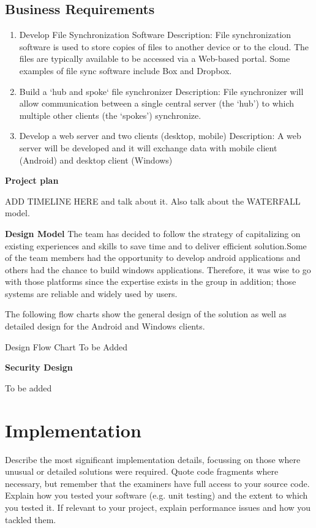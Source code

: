 \documentclass{article}
\begin{document}
\subsection{Business Requirements}
\begin{enumerate}
  \item Develop File Synchronization Software
  Description:  File synchronization software is used to store copies of files to another device or to the cloud. The files are typically available to be accessed via a Web-based portal. Some examples of file sync software include Box and Dropbox.
  \item Build a ‘hub and spoke‘ file synchronizer
  Description: File synchronizer will allow communication between a single central server (the ‘hub’) to which multiple other clients (the ‘spokes’) synchronize.
  \item Develop a web server and two clients (desktop, mobile)
  Description: A web server will be developed and it will exchange data with mobile client (Android) and desktop client (Windows)
\end{enumerate}


\textbf{Project plan}

ADD TIMELINE HERE and talk about it. Also talk about the WATERFALL model.

\textbf{Design Model}
The team has decided to follow the strategy of capitalizing on existing experiences and skills to save time and to deliver efficient solution.Some of the team members had the opportunity to develop android applications and others had the chance to build windows applications. Therefore, it was wise to go with those platforms since the expertise exists in the group in addition; those systems are reliable and widely used by users.

The following flow charts show the general design of the solution as well as detailed design for the Android and Windows clients.

Design Flow Chart
To be Added

\textbf{Security Design}

To be added

\section{Implementation}
Describe the most significant implementation details, focussing on those where unusual or detailed solutions were required. Quote code fragments where necessary, but remember that the examiners have full access to your source code. Explain how you tested your software (e.g. unit testing) and the extent to which you tested it. If relevant to your project, explain performance issues and how you tackled them.
\end{document}
